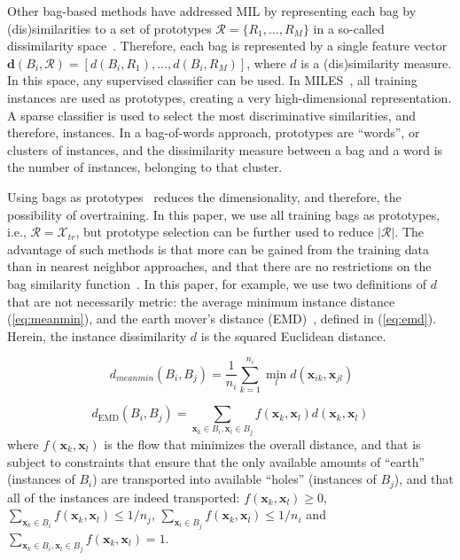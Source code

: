 \documentclass[10pt,conference,a4paper]{IEEEtran}
\begin{document}
Other bag-based methods have addressed MIL by representing each bag by (dis)similarities to a set of prototypes $\mathcal{R} = \{R_1, \ldots, R_M\}$ in a so-called dissimilarity space~\cite{pekalska2005dissimilarity}. Therefore, each bag is represented by a single feature vector $ \mathbf{d}$$(B_i, \mathcal{R})= [d(B_i, R_1), \ldots, d(B_i, R_M)]$, where $d$ is a (dis)similarity measure. In this space, any supervised classifier can be used. In MILES~\cite{chen2006miles}, all training instances are used as prototypes, creating a very high-dimensional representation. A sparse classifier is used to select the most discriminative similarities, and therefore, instances. In a bag-of-words approach, prototypes are ``words'', or clusters of instances, and the dissimilarity measure between a bag and a word is the number of instances, belonging to that cluster.

Using bags as prototypes~\cite{tax2011bag,cheplygina2012does} reduces the dimensionality, and therefore, the possibility of overtraining. In this paper, we use all training bags as prototypes, i.e., $\mathcal{R} = \mathcal{X}_{tr}$, but prototype selection can be further used to reduce $|\mathcal{R}|$. The advantage of such methods is that more can be gained from the training data than in nearest neighbor approaches, and that there are no restrictions on the bag similarity function~\cite{pkekalska2006non}. In this paper, for example, we use two definitions of $d$ that are not necessarily metric: the average minimum instance distance (\ref{eq:meanmin}), and the earth mover's distance (EMD)~\cite{rubner2000earth}, defined in (\ref{eq:emd}). Herein, the instance dissimilarity $d$ is the squared Euclidean distance.


\begin{equation}~\label{eq:meanmin}
d_{meanmin}(B_i, B_j)  =  \frac{1}{n_i}\sum_{k=1}^{n_i} \min_{l} d(\mathbf{x}_{ik}, \mathbf{x}_{jl})
\end{equation}

\begin{equation}\label{eq:emd}
d_{\text{EMD}}(B_i,B_j) = \sum_{\mathbf{x}_{k} \in B_i, \mathbf{x}_{l} \in B_j}f(\mathbf{x}_{k},\mathbf{x}_{l}) d(\mathbf{x}_{k},\mathbf{x}_{l})
\end{equation}
where $f(\mathbf{x}_{k},\mathbf{x}_{l})$ is the flow that minimizes the overall distance, and that is subject to constraints that ensure that the only available amounts of ``earth'' (instances of $B_i$) are transported into available ``holes'' (instances of $B_j$), and that all of the instances are indeed transported: $f(\mathbf{x}_{k}, \mathbf{x}_{l}) \geq 0$, $\sum_{\mathbf{x}_{k} \in B_i} f(\mathbf{x}_{k}, \mathbf{x}_{l}) \leq 1/n_j$, $\sum_{\mathbf{x}_{l} \in B_j} f(\mathbf{x}_{k}, \mathbf{x}_{l}) \leq 1/n_i$ and $\sum_{\mathbf{x}_{k}\in B_i, \mathbf{x}_{l} \in B_j} f(\mathbf{x}_{k},\mathbf{x}_{l}) = 1$.
\end{document}
